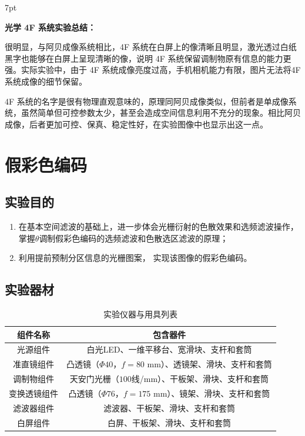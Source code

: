 \documentclass[UTF8]{article}
\theoremstyle{MyLineTheoremStyle} %
\theoremstyle{MyBlockTheoremStyle} %
\theoremstyle{MySubsubsectionStyle} %
\newenvironment{graybox}{%
        \def\FrameCommand{%
        \hspace{1pt}%
        {\color{gray}\vrule width 2pt}%
        {\color{graybox_color}\vrule width 4pt}%
        \colorbox{graybox_color}%
        }%
        \MakeFramed{\advance\hsize-\width\FrameRestore}%
        \noindent\hspace{-4.55pt}%
        \begin{adjustwidth}{}{7pt}%
        \vspace{2pt}\vspace{2pt}%
        }
        {%
        \vspace{2pt}\end{adjustwidth}\endMakeFramed%
        }
\begin{document}
\begin{graybox}
\textbf{光学 4F 系统实验总结：}

很明显，与阿贝成像系统相比，4F 系统在白屏上的像清晰且明显，激光透过白纸黑字也能够在白屏上呈现清晰的像，说明 4F 系统保留调制物原有信息的能力更强。实际实验中，由于 4F 系统成像亮度过高，手机相机能力有限，图片无法将4F 系统成像的细节保留。

4F 系统的名字是很有物理直观意味的，原理同阿贝成像类似，但前者是单成像系统，虽然简单但可控参数太少，甚至会造成空间信息利用不充分的现象。相比阿贝成像，后者更加可控、保真、稳定性好，在实验图像中也显示出这一点。

\end{graybox}



\section{假彩色编码}

\subsection{实验目的}
\begin{enumerate}
\item 在基本空间滤波的基础上，进一步体会光栅衍射的色散效果和选频滤波操作，掌握$\theta$调制假彩色编码的选频滤波和色散选区滤波的原理；
\item 利用提前预制分区信息的光栅图案，
实现该图像的假彩色编码。
\end{enumerate}



\subsection{实验器材}

\begin{table}[H]
    \centering
    \caption{实验仪器与用具列表}
    \begin{tabular}{cc}
        \toprule
        组件名称 & 包含器件\\ \midrule
        光源组件& 白光LED、一维平移台、宽滑块、支杆和套筒\\ 
        准直镜组件& 凸透镜（$\Phi 40$，$f=80$ mm）、透镜架、滑块、支杆和套筒 \\ 
        调制物组件& 天安门光栅（$100$线/mm）、干板架、滑块、支杆和套筒\\ 
        变换透镜组件& 凸透镜（$\Phi 76$，$f=175$ mm）、镜架、滑块、支杆和套筒\\ 
        滤波器组件& 滤波器、干板架、滑块、支杆和套筒\\ 
        白屏组件& 白屏、干板架、滑块、支杆和套筒\\ 
        \bottomrule
    \end{tabular}
\end{table}
\end{document}
